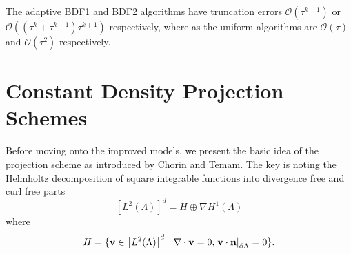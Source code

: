 \documentclass[letterpaper]{erdc}
\begin{document}
The adaptive BDF1 and BDF2 algorithms have truncation errors $\mathcal{O}\left(\tau^{k+1}\right)$ or $\mathcal{O}\left(\left(\tau^{k}+\tau^{k+1} \right)\tau^{k+1} \right)$ respectively, where as the uniform algorithms are $\mathcal{O}(\tau)$ and $\mathcal{O}(\tau^{2})$ respectively.
  

%
%
%
\section{Constant Density Projection Schemes}
Before moving onto the improved models, we present the basic idea of the projection scheme as introduced by Chorin and Temam.  The key is noting the Helmholtz decomposition of square integrable functions into divergence free and curl free parts
\begin{equation}
\left[ L^2(\Lambda)\right]^d = H \oplus \nabla H^1(\Lambda)
\end{equation}
where
\begin{equation}
H = \{ \textbf{v}\in \left[ L^2(\Lambda)\right]^d \:|\: \nabla\cdot \textbf{v} = 0, \left.\textbf{v}\cdot\textbf{n} \right|_{\partial\Lambda} = 0  \}.
\end{equation}
\end{document}
